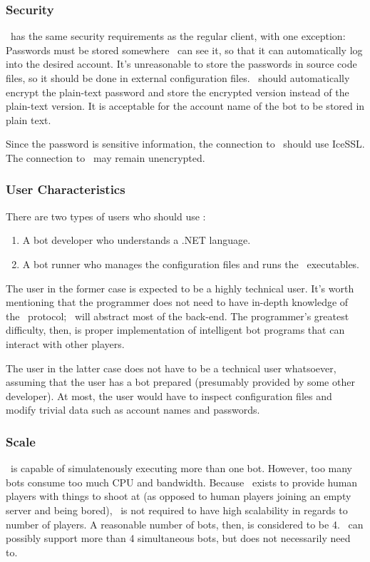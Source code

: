\subsubsection*{Security}

\AI\ has the same security requirements as the regular client, with one exception: Passwords must be stored somewhere \AI\ can see it, so that it can automatically log into the desired account. It's unreasonable to store the passwords in source code files, so it should be done in external configuration files. \AI\ should automatically encrypt the plain-text password and store the encrypted version instead of the plain-text version. It is acceptable for the account name of the bot to be stored in plain text.

Since the password is sensitive information, the connection to \MainServer\ should use IceSSL. The connection to \GameServer\ may remain unencrypted.

\subsubsection*{User Characteristics}

There are two types of users who should use \AI:
\begin{enumerate}
\item A bot developer who understands a .NET language.
\item A bot runner who manages the configuration files and runs the \AI\ executables.
\end{enumerate}

The user in the former case is expected to be a highly technical user. It's worth mentioning that the programmer does not need to have in-depth knowledge of the \VTank\ protocol; \AI\ will abstract most of the back-end. The programmer's greatest difficulty, then, is proper implementation of intelligent bot programs that can interact with other players.

The user in the latter case does not have to be a technical user whatsoever, assuming that the user has a bot prepared (presumably provided by some other developer). At most, the user would have to inspect configuration files and modify trivial data such as account names and passwords.

\subsubsection*{Scale}

\AI\ is capable of simulatenously executing more than one bot. However, too many bots consume too much CPU and bandwidth. Because \AI\ exists to provide human players with things to shoot at (as opposed to human players joining an empty server and being bored), \AI\ is not required to have high scalability in regards to number of players. A reasonable number of bots, then, is considered to be 4. \AI\ can possibly support more than 4 simultaneous bots, but does not necessarily need to.

